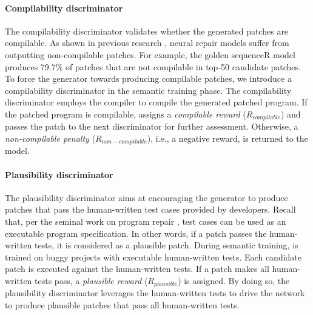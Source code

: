 \paragraph{Compilability discriminator} 
\label{sec:compiler_discriminator}

The compilability discriminator validates whether the generated patches are compilable. 
As shown in previous research \cite{CURE-icse21}, neural repair models suffer from outputting  non-compilable patches. 
For example, the golden sequenceR model produces 79.7\% of patches that are not compilable in top-50 candidate patches. 
To force the generator towards producing compilable patches, we introduce a compilability discriminator in the semantic training phase.
The compilability discriminator employs the compiler to compile the generated patched program.
If the patched program is compilable, \approach assigns a \textit{compilable reward} ($R_{compilable}$) and passes the patch to the next discriminator for further assessment. Otherwise, a \textit{non-compilable penalty} ($R_{non-compilable}$), i.e., a negative reward, is returned to the \approach model.

\paragraph{Plausibility  discriminator} 
\label{sec:plausible_discriminator}
The plausibility discriminator aims at encouraging the generator to produce patches that pass the human-written test cases provided by developers.
Recall that, per the seminal work on program repair \cite{LeGoues2012GenProg}, test cases can be used as an executable program specification.
In other words, if a patch passes the human-written tests, it is considered as a plausible patch. 
During semantic training, \approach is trained on buggy projects with executable human-written tests.
Each candidate patch is executed against the human-written tests.
If a patch makes all human-written tests pass, a \textit{plausible reward} ($R_{plausible}$) is assigned. 
By doing so, the plausibility discriminator leverages the human-written tests to drive the network to produce plausible  patches that pass all human-written tests.

